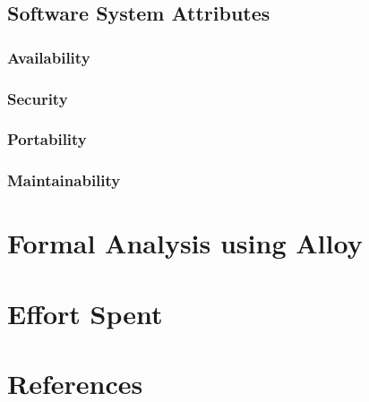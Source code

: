 \documentclass[numbers=noenddot, 12pt, a4paper, oneside]{scrbook}
\begin{document}
\section{Software System Attributes}

\subsection*{Availability}


\subsection*{Security}


\subsection*{Portability}


\subsection*{Maintainability}



\chapter{Formal Analysis using Alloy}
\chapter{Effort Spent}
\chapter{References}
\end{document}
